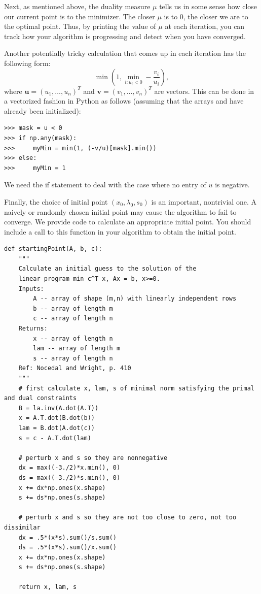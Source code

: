 Next, as mentioned above, the duality measure $\mu$ tells us in some sense how close our current point is to the minimizer.
The closer $\mu$ is to 0, the closer we are to the optimal point. Thus, by printing the value of $\mu$ at
each iteration, you can track how your algorithm is progressing and detect when you have converged.

Another potentially tricky calculation that comes up in each iteration has the following form:
\[
\min\left(1, \displaystyle\min_{i : u_i < 0}-\frac{v_i}{u_i}\right),
\]
where $\mathbf{u} = (u_1, \ldots, u_n)^T$ and $\mathbf{v} = (v_1, \ldots, v_n)^T$ are vectors.
This can be done in a vectorized fashion in Python as follows (assuming that the arrays  and 
have already been initialized):
\begin{lstlisting}
>>> mask = u < 0
>>> if np.any(mask):
>>>     myMin = min(1, (-v/u)[mask].min())
>>> else:
>>>     myMin = 1
\end{lstlisting}
We need the if statement to deal with the case where no entry of $u$ is negative.

Finally, the choice of initial point $(x_0, \lambda_0, s_0)$ is an important, nontrivial one.
A naively or randomly chosen initial point may cause the algorithm to fail to converge.
We provide code to calculate an appropriate initial point. You should include a call to this function in your algorithm to obtain the initial point.

\begin{lstlisting}
def startingPoint(A, b, c):
    """
    Calculate an initial guess to the solution of the
    linear program min c^T x, Ax = b, x>=0.
    Inputs:
        A -- array of shape (m,n) with linearly independent rows
        b -- array of length m
        c -- array of length n
    Returns:
        x -- array of length n
        lam -- array of length m
        s -- array of length n
    Ref: Nocedal and Wright, p. 410
    """
    # first calculate x, lam, s of minimal norm satisfying the primal and dual constraints
    B = la.inv(A.dot(A.T))
    x = A.T.dot(B.dot(b))
    lam = B.dot(A.dot(c))
    s = c - A.T.dot(lam)

    # perturb x and s so they are nonnegative
    dx = max((-3./2)*x.min(), 0)
    ds = max((-3./2)*s.min(), 0)
    x += dx*np.ones(x.shape)
    s += ds*np.ones(s.shape)

    # perturb x and s so they are not too close to zero, not too dissimilar
    dx = .5*(x*s).sum()/s.sum()
    ds = .5*(x*s).sum()/x.sum()
    x += dx*np.ones(x.shape)
    s += ds*np.ones(s.shape)

    return x, lam, s
\end{lstlisting}

